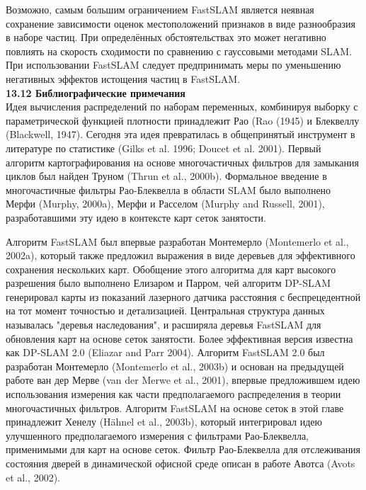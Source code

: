 \documentclass[10pt,a4paper]{article}
\begin{document}
Возможно, самым большим ограничением FastSLAM является неявная сохранение зависимости оценок местоположений признаков   
в виде разнообразия в наборе частиц. При определённых обстоятельствах это может негативно повлиять на скорость сходимости по сравнению с гауссовыми методами SLAM. При использовании FastSLAM следует предпринимать меры по уменьшению негативных эффектов истощения частиц в FastSLAM.\\

\textbf{13.12	Библиографические примечания}\\

Идея вычисления распределений по наборам переменных, комбинируя выборку с параметрической функцией плотности принадлежит Рао (Rao (1945) и Блеквеллу (Blackwell, 1947). Сегодня эта идея превратилась в общепринятый инструмент в литературе по статистике (Gilks et al. 1996; Doucet et al. 2001). Первый алгоритм картографирования на основе многочастичных фильтров для замыкания циклов был найден Труном (Thrun et al., 2000b). Формальное введение в многочастичные фильтры Рао-Блеквелла в области SLAM было выполнено Мерфи (Murphy, 2000a), Мерфи и Расселом (Murphy and Russell, 2001), разработавшими эту идею в контексте карт сеток занятости.

Алгоритм FastSLAM был впервые разработан Монтемерло (Montemerlo et al., 2002a), который также предложил выражения в виде деревьев для эффективного сохранения нескольких карт. Обобщение этого алгоритма для карт высокого разрешения было выполнено Елизаром и Парром, чей алгоритм DP-SLAM генерировал карты из показаний лазерного датчика расстояния с беспрецедентной на тот момент точностью и детализацией. Центральная структура данных называлась "деревья наследования", и расширяла деревья FastSLAM для обновления карт на основе сеток занятости. Более эффективная версия известна как DP-SLAM 2.0 (Eliazar and Parr 2004). Алгоритм FastSLAM 2.0 был разработан Монтемерло (Montemerlo et al., 2003b) и основан на предыдущей работе ван дер Мерве (van der Merwe et al., 2001), впервые предложившем идею использования измерения как части предполагаемого распределения в теории многочастичных фильтров. Алгоритм FastSLAM на основе сеток в этой главе принадлежит Хенелу (Hähnel et al., 2003b), который интегрировал идею улучшенного предполагаемого измерения с фильтрами Рао-Блеквелла, применимыми для карт на основе сеток. Фильтр Рао-Блеквелла для отслеживания состояния дверей в динамической офисной среде описан в работе Авотса (Avots et al., 2002).
\end{document}
